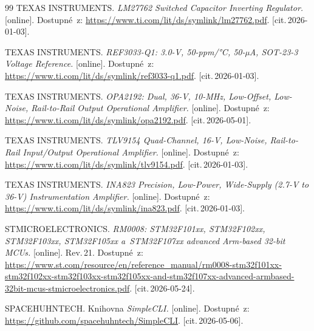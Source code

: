 \begin{thebibliography}{99}
	TEXAS INSTRUMENTS.
	\emph{LM27762 Switched Capacitor Inverting Regulator.} [online].
	Dostupné~z: \url{https://www.ti.com/lit/ds/symlink/lm27762.pdf}. [cit.\,2026-01-03].

	TEXAS INSTRUMENTS.
	\emph{REF3033-Q1: 3.0-V, 50-ppm/°C, 50-µA, SOT-23-3 Voltage Reference.} [online].
	Dostupné~z: \url{https://www.ti.com/lit/ds/symlink/ref3033-q1.pdf}. [cit.\,2026-01-03].


	TEXAS INSTRUMENTS.
	\emph{OPA2192: Dual, 36-V, 10-MHz, Low-Offset, Low-Noise, Rail-to-Rail Output Operational Amplifier.} [online].
	Dostupné~z: \url{https://www.ti.com/lit/ds/symlink/opa2192.pdf}. [cit.\,2026-05-01].

	TEXAS INSTRUMENTS.
	\emph{TLV9154 Quad-Channel, 16-V, Low-Noise, Rail-to-Rail Input/Output Operational Amplifier.} [online].
	Dostupné~z: \url{https://www.ti.com/lit/ds/symlink/tlv9154.pdf}. [cit.\,2026-01-03].

	TEXAS INSTRUMENTS.
	\emph{INA823 Precision, Low-Power, Wide-Supply (2.7-V to 36-V) Instrumentation Amplifier.} [online].
	Dostupné~z: \url{https://www.ti.com/lit/ds/symlink/ina823.pdf}. [cit.\,2026-01-03].

	STMICROELECTRONICS.
	\emph{RM0008: STM32F101xx, STM32F102xx, STM32F103xx, STM32F105xx a~STM32F107xx advanced Arm-based 32-bit MCUs.} [online].
	Rev.\,21.
	Dostupné~z: \url{https://www.st.com/resource/en/reference_manual/rm0008-stm32f101xx-stm32f102xx-stm32f103xx-stm32f105xx-and-stm32f107xx-advanced-armbased-32bit-mcus-stmicroelectronics.pdf}. [cit.\,2026-05-24].


SPACEHUHNTECH.
Knihovna \emph{SimpleCLI.} [online].
Dostupné~z: \url{https://github.com/spacehuhntech/SimpleCLI}. [cit.\,2026-05-06].




\end{thebibliography}
